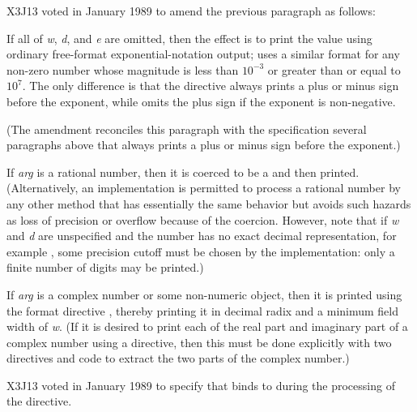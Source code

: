 \begin{flushdesc}
\begin{new}
X3J13 voted in January 1989
to amend the previous paragraph as follows:

If all of \emph{w}, \emph{d}, and \emph{e} are omitted, then the effect is to print
the value using ordinary free-format exponential-notation output;
 uses a similar format for any non-zero number whose magnitude
is less than $10^{-3}$ or greater than or equal to $10^7$.
The only difference is that the  directive always prints
a plus or minus sign before the exponent, while  omits the plus sign
if the exponent is non-negative.

(The amendment reconciles this paragraph with the specification several
paragraphs above that  always prints
a plus or minus sign before the exponent.)
\end{new}

If \emph{arg} is a rational number, then it is coerced to be a 
and then printed.  (Alternatively, an implementation is permitted to
process a rational number by any other method that has essentially the
same behavior but avoids such hazards as loss of precision or overflow
because of the coercion.  However, note that if \emph{w} and \emph{d} are
unspecified and the number has no exact decimal representation,
for example , some precision cutoff must be chosen
by the implementation: only a finite number of digits may be printed.)

If \emph{arg} is a complex number or some non-numeric
object, then it is printed using the format directive ,
thereby printing it in decimal radix and a minimum field width of \emph{w}.
(If it is desired to print each of the real part and imaginary part
of a complex number using a  directive, then this must
be done explicitly with two  directives and code to
extract the two parts of the complex number.)

\begin{new}
X3J13 voted in January 1989
to specify that  binds  to 
during the processing of the  directive.
\end{new}


\end{flushdesc}
